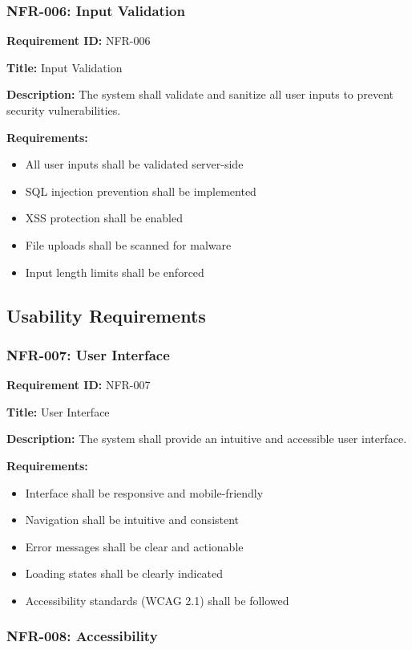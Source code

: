 \documentclass[12pt,a4paper]{article}
\begin{document}
\subsubsection{NFR-006: Input Validation}

\textbf{Requirement ID:} NFR-006

\textbf{Title:} Input Validation

\textbf{Description:} The system shall validate and sanitize all user inputs to prevent security vulnerabilities.

\textbf{Requirements:}
\begin{itemize}
    \item All user inputs shall be validated server-side
    \item SQL injection prevention shall be implemented
    \item XSS protection shall be enabled
    \item File uploads shall be scanned for malware
    \item Input length limits shall be enforced
\end{itemize}

\subsection{Usability Requirements}

\subsubsection{NFR-007: User Interface}

\textbf{Requirement ID:} NFR-007

\textbf{Title:} User Interface

\textbf{Description:} The system shall provide an intuitive and accessible user interface.

\textbf{Requirements:}
\begin{itemize}
    \item Interface shall be responsive and mobile-friendly
    \item Navigation shall be intuitive and consistent
    \item Error messages shall be clear and actionable
    \item Loading states shall be clearly indicated
    \item Accessibility standards (WCAG 2.1) shall be followed
\end{itemize}

\subsubsection{NFR-008: Accessibility}
\end{document}
